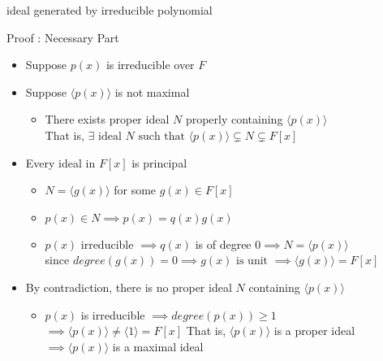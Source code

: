\documentclass{beamer}
\begin{document}
\begin{frame}{ideal generated by irreducible polynomial}
\begin{block}{Proof : Necessary Part}
\begin{itemize}
	\item Suppose $p(x)$ is irreducible over $F$
	\item Suppose $\langle p(x) \rangle$ is not maximal
	\begin{itemize}
		\item There exists proper ideal $N$ properly containing $\langle p(x) \rangle$\\ That is, $\exists \text{ ideal } N \text{ such that } \langle p(x) \rangle \subsetneq N \subsetneq F[x]$
	\end{itemize}
	\item Every ideal in $F[x]$ is principal
	\begin{itemize}
		\item $N = \langle g(x) \rangle$ for some $g(x) \in F[x]$
		\item $p(x) \in N \implies p(x) = q(x)g(x)$
		\item $p(x)$ irreducible $\implies q(x)$ is of degree $0 \implies N = \langle p(x) \rangle$\\
			since $degree(g(x)) = 0 \implies g(x) \text{ is unit } \implies \langle g(x) \rangle = F[x]$
	\end{itemize}
	\item By contradiction, there is no proper ideal $N$ containing $\langle p(x) \rangle$
	\begin{itemize}
		\item $p(x)$ is irreducible $\implies degree(p(x)) \ge 1$\\
		$\implies \langle p(x) \rangle \ne \langle 1 \rangle = F[x]$
		That is, $\langle p(x) \rangle $ is a proper ideal \\
		$\implies \langle p(x) \rangle $ is a maximal ideal
	\end{itemize}
\end{itemize}
\end{block}
\end{frame}
\end{document}
